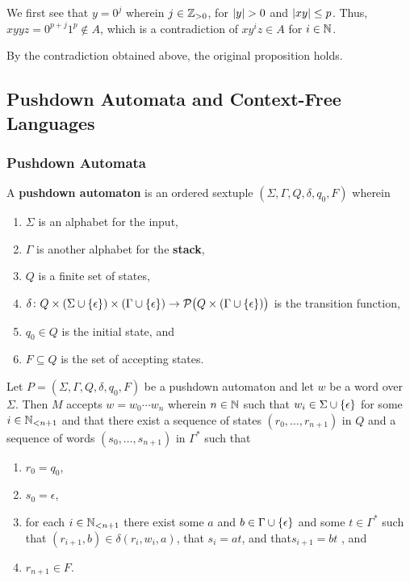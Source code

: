     We first see that \(y = 0^j\) wherein \(j \in \posint\), for \(\abs{y} > 0\)
    and \(\abs{x y} \leq p\). Thus, \(x y y z = 0^{p + j} 1^p \not\in A\), which
    is a contradiction of \(x y^i z \in A\) for \(i \in \setnat\).

    By the contradiction obtained above, the original proposition holds.
\Esl

\subsection{Pushdown Automata and Context-Free Languages}

\subsubsection{Pushdown Automata}

\Bdf
    A {\bf pushdown automaton} is an ordered sextuple \((\Sigma, \Gamma, Q,
    \delta, q_0, F)\) wherein
    \begin{enumerate}
        \item \(\Sigma\) is an alphabet for the input,
        \item \(\Gamma\) is another alphabet for the {\bf stack},
        \item \(Q\) is a finite set of states,
        \item \(\map{\delta}{Q \times (\Sigma \cup \set{\epsilon}) \times
        (\Gamma \cup \set{\epsilon})}{\pow\big(Q \times (\Gamma \cup
        \set{\epsilon})\big)}\) is the transition function,
        \item \(q_0 \in Q\) is the initial state, and
        \item \(F \subseteq Q\) is the set of accepting states.
    \end{enumerate}
\Edf

Let \(P = (\Sigma, \Gamma, Q, \delta, q_0, F)\) be a pushdown automaton and let
\(w\) be a word over \(\Sigma\). Then \(M\) accepts \(w = w_0 \cdots w_n\)
wherein \(n \in \setnat\) such that \(w_i \in \Sigma \cup \set{\epsilon}\) for
some \(i \in \Nln[n + 1]\) and that there exist a sequence of states \((r_0,
\ldots, r_{n + 1})\) in \(Q\) and a sequence of words \((s_0, \ldots, s_{n +
1})\) in \(\Gamma^*\) such that
\begin{enumerate}
    \item \(r_0 = q_0\),
    \item \(s_0 = \epsilon\),
    \item for each \(i \in \Nln[n + 1]\) there exist some \(a\) and \(b \in
    \Gamma \cup \set{\epsilon}\) and some \(t \in \Gamma^*\) such that \((r_{i +
    1}, b) \in \delta(r_i, w_i, a)\), that \(s_i = a t\), and that\(s_{i + 1} =
    b t\) , and \item \(r_{n + 1} \in F\).
\end{enumerate}

